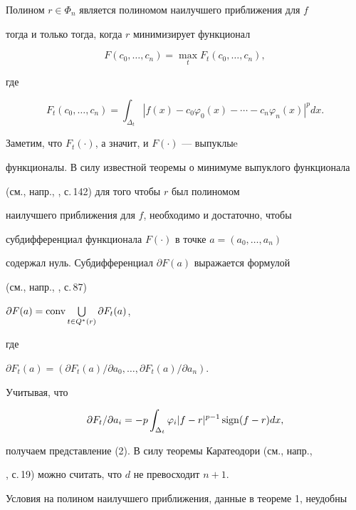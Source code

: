 \begin{pf} 


Полином $r\in\Phi_n$ является полиномом наилучшего приближения для $f$ 


тогда и только тогда, когда $r$ минимизирует функционал 


$$ 


F(c_0,\dotsc,c_n)=\max_t F_t(c_0,\dotsc,c_n), 


$$ 


где 


$$ 


F_t(c_0,\dotsc,c_n)=\int_{\Delta_t}|f(x)-c_0\varphi_0(x)- 


\dotsb-c_n\varphi_n(x)|^p dx. 


$$ 


Заметим, что $F_t(\cdot)$, а значит, и $F(\cdot)$ --- выпуклыe 


функционалы. В силу известной теоремы о минимуме выпуклого функционала 


(см., напр., \cite{3}, с.\,142) для того чтобы $r$ был полиномом 


наилучшего приближения для $f$, необходимо и достаточно, чтобы 


субдифференциал функционала $F(\cdot)$ в точке $a=(a_0,\dotsc,a_n)$ 


содержал нуль. Субдифференциал $\partial F(a)$ выражается формулой 


(см., напр., \cite{3}, с.\,87) 


$\partial F(a)=\operatorname{conv}\bigcup\limits_{t\in Q^*(r)}\partial F_t(a)$, 


где 


$\partial F_t(a)=(\partial F_t(a)/\partial a_0,\dotsc,\partial F_t(a)/ 


\partial a_n)$. 


Учитывая, что 


$$ 


\partial F_t/\partial a_i=-p\int_{\Delta_t}\varphi_i|f-r|^{p-1} 


\sign(f-r)dx, 


$$ 


получаем представление (2). В силу теоремы Каратеодори (см., напр., 


\cite{4}, с.\,19) можно считать, что $d$ не превосходит $n+1$. 


\end{pf} 


 


Условия на полином наилучшего приближения, данные в теореме 1, неудобны 


